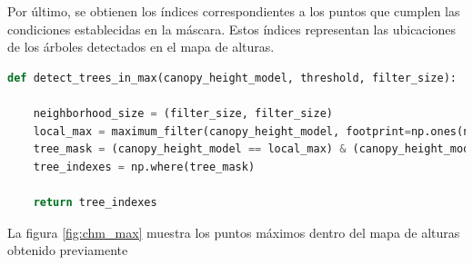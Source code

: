 Por último, se obtienen los índices correspondientes a los puntos que cumplen las condiciones establecidas en la máscara. Estos índices representan las ubicaciones de los árboles detectados en el mapa de alturas.

\vspace{0.2cm}
\begin{lstlisting}[language=Python, caption={Código para la busqueda de máximos }, label=lst:detectT]
def detect_trees_in_max(canopy_height_model, threshold, filter_size):

    neighborhood_size = (filter_size, filter_size)
    local_max = maximum_filter(canopy_height_model, footprint=np.ones(neighborhood_size), mode='constant')
    tree_mask = (canopy_height_model == local_max) & (canopy_height_model > threshold)
    tree_indexes = np.where(tree_mask)
    
    return tree_indexes
\end{lstlisting}

La figura \ref{fig:chm_max} muestra los puntos máximos dentro del mapa de alturas obtenido previamente

